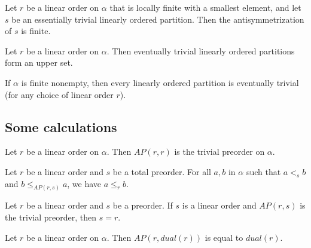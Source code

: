 \begin{sublemma}
Let $r$ be a linear order on $\alpha$ that is locally finite with a smallest element, and let $s$ be an essentially trivial linearly
ordered partition. Then the antisymmetrization of $s$ is finite.

\end{sublemma}

\begin{sublemma}
Let $r$ be a linear order on $\alpha$. Then eventually trivial linearly ordered partitions form an upper set.

\end{sublemma}

\begin{sublemma}
If $\alpha$ is finite nonempty, then every linearly ordered partition is eventually trivial (for any choice of linear order $r$).

\end{sublemma}


\subsection{Some calculations}

\begin{sublemma}
Let $r$ be a linear order on $\alpha$. Then $AP(r,r)$ is the trivial preorder on $\alpha$.

\end{sublemma}

\begin{sublemma}
Let $r$ be a linear order and $s$ be a total preorder. For all $a,b$ in $\alpha$ such that
$a<_s b$ and $b\le_{AP(r,s)} a$, we have $a\le_r b$.

\end{sublemma}

\begin{sublemma}
Let $r$ be a linear order and $s$ be a preorder. If $s$ is a linear order and $AP(r,s)$ is the trivial preorder, then $s=r$. 

\end{sublemma}

\begin{sublemma}
Let $r$ be a linear order on $\alpha$. Then $AP(r, dual(r))$ is equal to $dual(r)$.

\end{sublemma}

